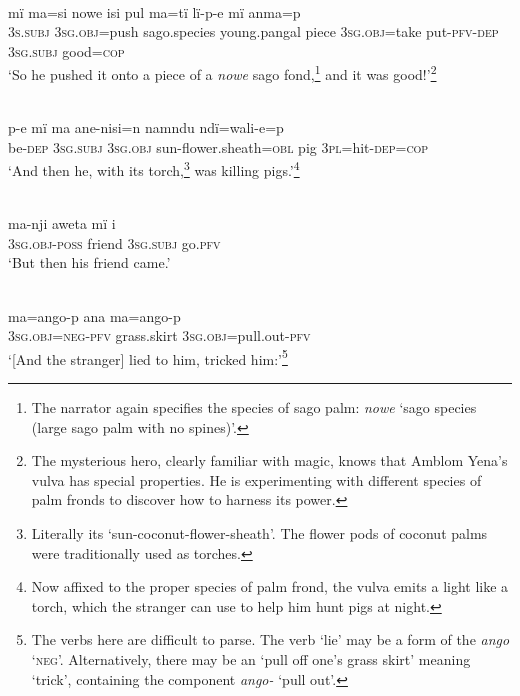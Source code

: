 \\
\gll mï      ma=si      nowe    isi        pul    ma=tï lï-p-e      mï       anma=p\\
3\textsc{s.subj}  3\textsc{sg.obj}=push  sago.species  young.pangal  piece  3\textsc{sg.obj}=take put-\textsc{pfv-dep}  3\textsc{sg.subj}  good=\textsc{cop}\\
\glt ‘So he pushed it onto a piece of a \textit{nowe} sago fond,\footnote{The narrator again specifies the species of sago palm: \textit{nowe} ‘sago species (large sago palm with no spines)’.} and it was good!’\footnote{The mysterious hero, clearly familiar with magic, knows that Amblom Yena’s vulva has special properties. He is experimenting with different species of palm fronds to discover how to harness its power.}

\\
\gll p-e    mï      ma      ane-nisi=n          namndu ndï=wali-e=p\\
be-\textsc{dep}  3\textsc{sg.subj}  3\textsc{sg.obj}  sun-flower.sheath=\textsc{obl}  pig 3\textsc{pl}=hit-\textsc{dep}=\textsc{cop}\\
\glt ‘And then he, with its torch,\footnote{Literally its ‘sun-coconut-flower-sheath’. The flower pods of coconut palms were traditionally used as torches.} was killing pigs.’\footnote{Now affixed to the proper species of palm frond, the vulva emits a light like a torch, which the stranger can use to help him hunt pigs at night.}

\newpage

\\
\gll ma-nji      aweta  mï      i\\
3\textsc{sg.obj-poss}  friend  3\textsc{sg.subj}  go.\textsc{pfv}\\
\glt ‘But then his friend came.’

\\
\gll ma=ango-p    ana      ma=ango-p\\
3\textsc{sg.obj}=\textsc{neg-pfv}  grass.skirt  3\textsc{sg.obj}=pull.out-\textsc{pfv}\\
\glt ‘[And the stranger] lied to him, tricked him:’\footnote{The verbs here are difficult to parse. The verb ‘lie’ may be a  form of the  \textit{ango} ‘\textsc{neg}’. Alternatively, there may be an  ‘pull off one’s grass skirt’ meaning ‘trick’, containing the component \textit{ango-} ‘pull out’.}

